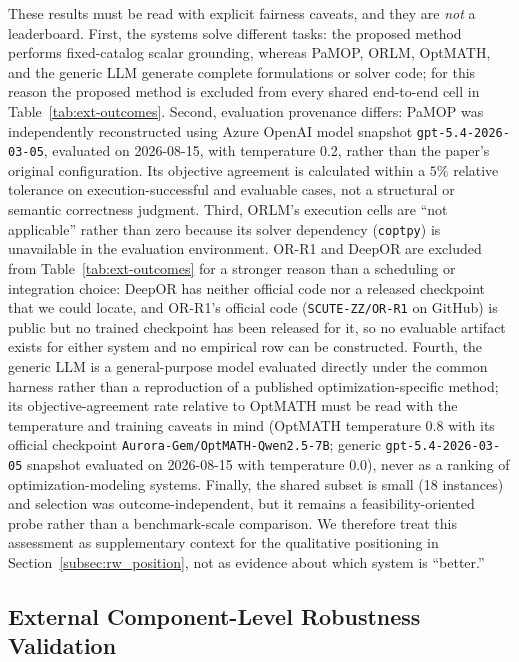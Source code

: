 \documentclass[3p]{elsarticle}
\begin{document}
These results must be read with explicit fairness caveats, and they are \emph{not} a leaderboard. First, the systems solve different tasks: the proposed method performs fixed-catalog scalar grounding, whereas PaMOP, ORLM, OptMATH, and the generic LLM generate complete formulations or solver code; for this reason the proposed method is excluded from every shared end-to-end cell in Table~\ref{tab:ext-outcomes}. Second, evaluation provenance differs: PaMOP was independently reconstructed using Azure OpenAI model snapshot \texttt{gpt-5.4-2026-03-05}, evaluated on 2026-08-15, with temperature 0.2, rather than the paper's original configuration. Its objective agreement is calculated within a $5\%$ relative tolerance on execution-successful and evaluable cases, not a structural or semantic correctness judgment. Third, ORLM's execution cells are ``not applicable'' rather than zero because its solver dependency (\texttt{coptpy}) is unavailable in the evaluation environment. OR-R1 and DeepOR are excluded from Table~\ref{tab:ext-outcomes} for a stronger reason than a scheduling or integration choice: DeepOR has neither official code nor a released checkpoint that we could locate, and OR-R1's official code (\texttt{SCUTE-ZZ/OR-R1} on GitHub) is public but no trained checkpoint has been released for it, so no evaluable artifact exists for either system and no empirical row can be constructed. Fourth, the generic LLM is a general-purpose model evaluated directly under the common harness rather than a reproduction of a published optimization-specific method; its objective-agreement rate relative to OptMATH must be read with the temperature and training caveats in mind (OptMATH temperature 0.8 with its official checkpoint \texttt{Aurora-Gem/OptMATH-Qwen2.5-7B}; generic \texttt{gpt-5.4-2026-03-05} snapshot evaluated on 2026-08-15 with temperature 0.0), never as a ranking of optimization-modeling systems. Finally, the shared subset is small (18 instances) and selection was outcome-independent, but it remains a feasibility-oriented probe rather than a benchmark-scale comparison. We therefore treat this assessment as supplementary context for the qualitative positioning in Section~\ref{subsec:rw_position}, not as evidence about which system is ``better.''

\subsection{External Component-Level Robustness Validation}
\label{subsec:exp_external_validation}
\end{document}
